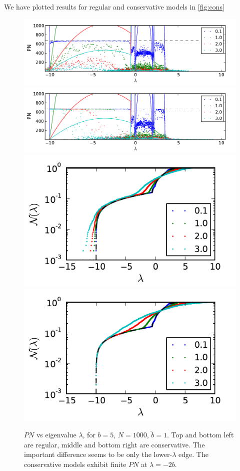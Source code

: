 \documentclass[onecolumn,fleqn,longbibliography]{revtex4}
\begin{document}
We have plotted results for regular and conservative models in \autoref{fig:cons}
\begin{figure}[H]
    \includegraphics{pta_B_T_pn}\\
    \includegraphics{pta_B_TC_pn}\\
    \includegraphics{pta_B_T_ev}
    \includegraphics{pta_B_TC_ev}
    \caption{$PN$ vs eigenvalue $\lambda$, for $b=5$, $N=1000$, $\tilde{b}=1$. Top and bottom left are regular,
    middle and bottom right are conservative. The important difference seems 
    to be only the lower-$\lambda$ edge. The conservative models exhibit finite $PN$ at $\lambda =-2b$.}
    \label{fig:cons}
\end{figure}
\end{document}
